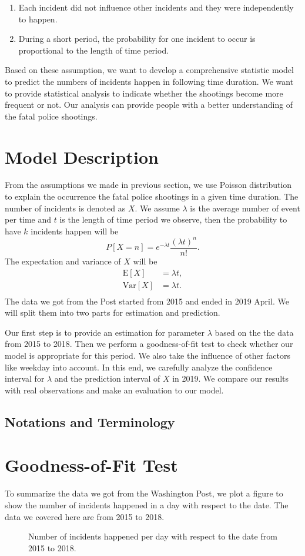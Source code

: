 \documentclass[11pt,a4paper,english]{article}
\begin{document}
\begin{enumerate}
    \item Each incident did not influence other incidents and they were independently to happen.
    \item During a short period, the probability for one incident to occur is proportional to the length of time period. 
\end{enumerate}
Based on these assumption, we want to develop a comprehensive statistic model to predict the numbers of incidents happen in following time duration. We want to provide statistical analysis to indicate whether the shootings become more frequent or not. Our analysis can provide people with a better understanding of the fatal police shootings.
\section{Model Description}
From the assumptions we made in previous section, we use Poisson distribution to explain the occurrence the fatal police shootings in a given time duration. The number of incidents is denoted as $X$. We assume $\lambda$ is the average number of event per time and $t$ is the length of time period we observe, then the probability to have $k$ incidents happen will be 
\[P[X = n] = e^{-\lambda t}\frac{(\lambda t)^{n}}{n!}.\]
The expectation and variance of $X$ will be 
\[
    \begin{aligned}
        \text{E}[X] &= \lambda t,\\
        \text{Var}[X]&= \lambda t.\\
    \end{aligned}
\]
The data we got from the Post started from 2015 and ended in 2019 April. We will split them into two parts for estimation and prediction.

Our first step is to provide an estimation for parameter $\lambda$ based on the the data from 2015 to 2018. Then we perform a goodness-of-fit test to check whether our model is appropriate for this period. We also take the influence of other factors like weekday into account. In this end, we carefully analyze the confidence interval for $\lambda$ and the prediction interval of $X$ in 2019. We compare our results with real observations and make an evaluation to our model. 
\subsection{Notations and Terminology}
\section{Goodness-of-Fit Test}
To summarize the data we got from the Washington Post, we plot a figure to show the number of incidents happened in a day with respect to the date. The data we covered here are from 2015 to 2018.
\begin{figure}[htbp]
    \centering
    \caption{Number of incidents happened per day with respect to the date from 2015 to 2018.}
\end{figure}
\end{document}
